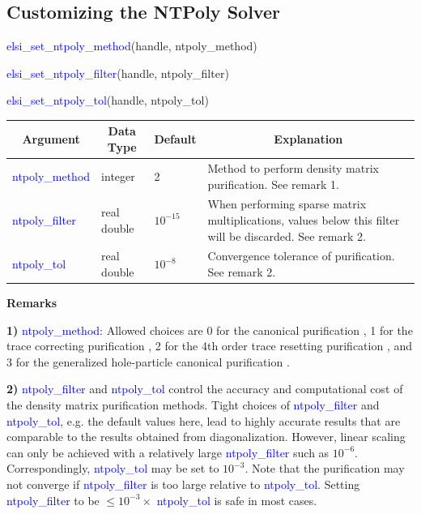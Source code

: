 \documentclass{report}
\begin{document}
\subsection{Customizing the NTPoly Solver}
\label{subsec:setter_ntpoly}
\begin{labeling}{\hspace{6cm}}
\item [\hspace{0.3cm} \textcolor{blue}{elsi\_set\_ntpoly\_method}(handle, ntpoly\_method)]
\item [\hspace{0.3cm} \textcolor{blue}{elsi\_set\_ntpoly\_filter}(handle, ntpoly\_filter)]
\item [\hspace{0.3cm} \textcolor{blue}{elsi\_set\_ntpoly\_tol}(handle, ntpoly\_tol)]
\end{labeling}

\begin{tabular}[]{|p{30mm}|p{20mm}|p{15mm}|p{100mm}|}
\hline
\multicolumn{1}{|c|}{\textbf{Argument}} & \multicolumn{1}{c|}{\textbf{Data Type}} & \multicolumn{1}{c|}{\textbf{Default}} & \multicolumn{1}{c|}{\textbf{Explanation}}\\
\hline
\textcolor{blue}{ntpoly\_method} & integer     & 2          & Method to perform density matrix purification. See remark 1.\\
\hline
\textcolor{blue}{ntpoly\_filter} & real double & $10^{-15}$ & When performing sparse matrix multiplications, values below this filter will be discarded. See remark 2.\\
\hline
\textcolor{blue}{ntpoly\_tol}    & real double & $10^{-8}$  & Convergence tolerance of purification. See remark 2.\\
\hline
\end{tabular}

\textbf{Remarks}

\textbf{1)} \textcolor{blue}{ntpoly\_method}: Allowed choices are 0 for the canonical purification \cite{purification_palser_1998}, 1 for the trace correcting purification \cite{purification_niklasson_2002}, 2 for the 4th order trace resetting purification \cite{purification_niklasson_2002}, and 3 for the generalized hole-particle canonical purification \cite{purification_truflandier_2016}.

\textbf{2)} \textcolor{blue}{ntpoly\_filter} and \textcolor{blue}{ntpoly\_tol} control the accuracy and computational cost of the density matrix purification methods. Tight choices of \textcolor{blue}{ntpoly\_filter} and \textcolor{blue}{ntpoly\_tol}, e.g. the default values here, lead to highly accurate results that are comparable to the results obtained from diagonalization. However, linear scaling can only be achieved with a relatively large \textcolor{blue}{ntpoly\_filter} such as $10^{-6}$. Correspondingly, \textcolor{blue}{ntpoly\_tol} may be set to $10^{-3}$. Note that the purification may not converge if \textcolor{blue}{ntpoly\_filter} is too large relative to \textcolor{blue}{ntpoly\_tol}. Setting \textcolor{blue}{ntpoly\_filter} to be $\le 10^{-3} \times $ \textcolor{blue}{ntpoly\_tol} is safe in most cases.
\end{document}
